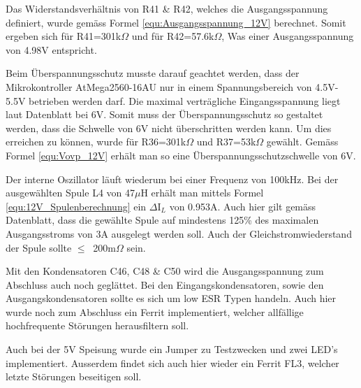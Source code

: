 Das Widerstandsverhältnis von R41 \& R42, welches die Ausgangsspannung definiert, wurde gemäss Formel \ref{equ:Ausgangsspannung_12V} berechnet. Somit ergeben sich für R41=301k$\Omega$ und für R42=57.6k$\Omega$, Was einer Ausgangsspannung von 4.98V entspricht. 

Beim Überspannungsschutz musste darauf geachtet werden, dass der Mikrokontroller AtMega2560-16AU nur in einem Spannungsbereich von 4.5V-5.5V betrieben werden darf. Die maximal verträgliche Eingangsspannung liegt laut Datenblatt bei 6V. Somit muss der Überspannungsschutz so gestaltet werden, dass die Schwelle von 6V nicht überschritten werden kann. Um dies erreichen zu können, wurde für R36=301k$\Omega$ und R37=53k$\Omega$ gewählt. Gemäss Formel \ref{equ:Vovp_12V} erhält man so eine Überspannungsschutzschwelle von 6V. 

Der interne Oszillator läuft wiederum bei einer Frequenz von 100kHz. Bei der ausgewählten Spule L4 von 47$\mu$H erhält man mittels Formel \ref{equ:12V_Spulenberechnung} ein $\Delta$I$_{L}$ von 0.953A. Auch hier gilt gemäss Datenblatt, dass die gewählte Spule auf mindestens 125\% des maximalen Ausgangsstroms von 3A ausgelegt werden soll. Auch der Gleichstromwiederstand der Spule sollte $ \leq \ $ 200m$\Omega$  sein. 

Mit den Kondensatoren C46, C48 \& C50 wird die Ausgangsspannung zum Abschluss auch noch geglättet. Bei den Eingangskondensatoren, sowie den Ausgangskondensatoren sollte es sich um low ESR Typen handeln. Auch hier wurde noch zum Abschluss ein Ferrit implementiert, welcher allfällige hochfrequente Störungen herausfiltern soll.

Auch bei der 5V Speisung wurde ein Jumper zu Testzwecken und zwei LED's implementiert. Ausserdem findet sich auch hier wieder ein Ferrit FL3, welcher letzte Störungen beseitigen soll. 


